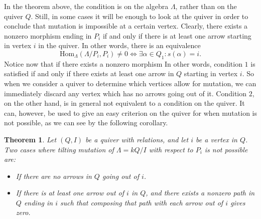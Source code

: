 \documentclass[12pt, dvipsnames, oneside]{amsart}
\newtheorem{theorem}{Theorem}[section]
\theoremstyle{definition}
\newcommand{\Hom}{\text{Hom}}
\begin{document}
\bigskip

In the theorem above, the condition is on the algebra $\Lambda$, rather than on the quiver $Q$. 
Still, in some cases it will be enough to look at the quiver in order to conclude that mutation is impossible at a certain vertex.
Clearly, there exists a nonzero morphism ending in $P_i$ if and only if there is at least one arrow starting in vertex $i$ in the quiver. In other words, there is an equivalence
\begin{equation*}
\Hom_\Lambda(\Lambda/P_i, P_i) \neq 0 \iff \exists \alpha \in Q_1 \colon s(\alpha) = i.
\end{equation*}
Notice now that if there exists a nonzero morphism
In other words, condition $1$ is satisfied if and only if there exists at least one arrow in $Q$ starting in vertex $i$. So when we consider a quiver to determine which vertices allow for mutation, we can immediately discard any vertex which has no arrows going out of it.
Condition $2$, on the other hand, is in general not equivalent to a condition on the quiver. It can, however, be used to give an easy criterion on the quiver for when mutation is not possible, as we can see by the following corollary. 

\bigskip

\begin{theorem} 
Let $(Q,I)$ be a quiver with relations, and let $i$ be a vertex in $Q$. Two cases where tilting mutation of $\Lambda=kQ/I$ with respect to $P_i$ is not possible are:
\begin{itemize}
\item If there are no arrows in $Q$ going out of $i$.
\item If there is at least one arrow out of $i$ in $Q$, and there exists a nonzero path in $Q$ ending in $i$ such that composing that path with each arrow out of $i$ gives zero.
\end{itemize}
\end{theorem}
\end{document}
